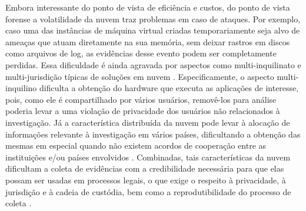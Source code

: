 \documentclass[conference]{IEEEtran}
\begin{document}
%
Embora interessante do ponto de vista de eficiência e custos, do ponto de vista forense a volatilidade da nuvem traz problemas em caso de ataques.
%
Por exemplo, caso uma das instâncias de máquina virtual criadas temporariamente seja alvo de ameaças que atuam diretamente na sua memória, sem deixar rastros em discos como arquivos de log, as evidências desse evento podem ser completamente perdidas.
%
Essa dificuldade é ainda agravada por aspectos como multi-inquilinato e multi-jurisdição típicas de soluções em nuvem \cite{Bash_Adv_in_Forensics:2015}.
%
Especificamente, o aspecto multi-inquilino dificulta a obtenção do hardware que executa as aplicações de interesse, pois, como ele é compartilhado por vários usuários, removê-los para análise poderia levar a uma violação de privacidade dos usuários não relacionados à investigação. 
%
Já a característica distribuída da nuvem pode levar à alocação de informações relevante à investigação em vários países, dificultando a obtenção das mesmas em especial quando não existem acordos de cooperação entre as instituições e/ou países envolvidos \cite{Dykstra_Acquiring_for_IAAS:2012}.
%
Combinadas, tais características da nuvem dificultam a coleta de evidências com a credibilidade necessária para que elas possam ser usadas em processos legais,  o que exige o respeito à privacidade, à jurisdição e à cadeia de custódia, bem como a reprodutibilidade do processo de coleta \cite{Rahman_Live_Forensics_Techniques:2015}.
\end{document}
